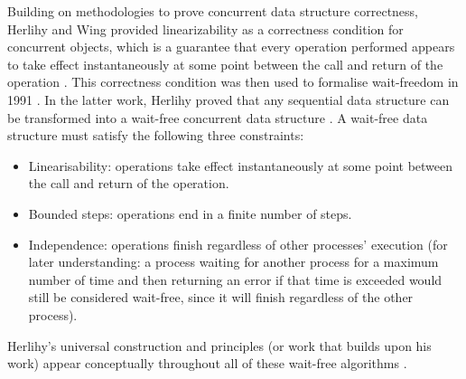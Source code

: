 Building on methodologies to prove concurrent data structure correctness, Herlihy and Wing provided linearizability as a correctness condition for concurrent objects, which is a guarantee that every operation performed appears to take effect instantaneously at some point between the call and return of the operation \cite{HerlihyLinearizability}. This correctness condition was then used to formalise wait-freedom in 1991 \cite{herlihy1991wait}. In the latter work, Herlihy proved that any sequential data structure can be transformed into a wait-free concurrent data structure \cite{herlihy1991wait}. A wait-free data structure must satisfy the following three constraints: 
\begin{itemize}
   \item Linearisability: operations take effect instantaneously at some point between the call and return of the operation.
   \item Bounded steps: operations end in a finite number of steps.
   \item Independence: operations finish regardless of other processes' execution (for later understanding: a process waiting for another process for a maximum number of time and then returning an error if that time is exceeded would still be considered wait-free, since it will finish regardless of the other process).
\end{itemize}
\cite{herlihy1991wait,HerlihyLinearizability}

Herlihy's universal construction and principles (or work that builds upon his work) appear conceptually throughout all of these wait-free algorithms \cite{Kogan2011WaitFreeQueues,FeldmanDechev2015WaitFreeRingBuffer,kogan2012methodology,FeldmanDechevV2,FeldmanDechevV3,RamalheteQueue,wCQWaitFreeQueue,Verma2013Scalable,FastFetchAndAddWaitFreeQueue,WangCacheCoherent,adampsc,jiffy,JayantiLog,Drescher2015GuardedSections,Mateíspmc,torquati2010singleproducersingleconsumerqueuessharedcache,Aldinucci2012EfficientSync,Wang2013BQueue,MaffioneCacheAware,ffq}. \cite{herlihy1991wait}

